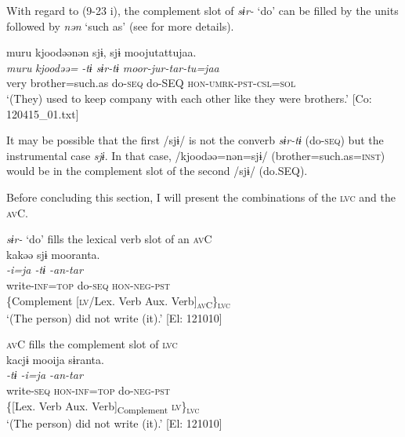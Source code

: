With regard to (9-23 i), the complement slot of \textit{sɨr-} ‘do’ can be filled by the units followed by \textit{nən} ‘such as’ (see  for more details).

\ea   \label{ex:9.33}
\glll  muru  kjoodəənən  sjɨ,  sjɨ  moojutattujaa.\\
    \textit{muru}  \textit{kjoodəə=}  \textit{-tɨ  sɨr-tɨ  moor-jur-tar-tu=jaa}\\
    very  brother=such.as  do-\textsc{seq}  do-SEQ  \textsc{hon}-\textsc{umrk}-\textsc{pst}-\textsc{csl}=\textsc{sol}\\
    \glt     ‘(They) used to keep company with each other like they were brothers.’ [Co: 120415\_01.txt]
\z

It may be possible that the first /sjɨ/ is not the converb \textit{sɨr-tɨ} (do-\textsc{seq}) but the instrumental case \textit{sjɨ}. In that case, /kjoodəə=nən=sjɨ/ (brother=such.as=\textsc{inst}) would be in the complement slot of the second /sjɨ/ (do.SEQ).

Before concluding this section, I will present the combinations of the \textsc{lvc} and the \textsc{av}C.

\ea   \label{ex:9.34}
\ea \textit{sɨr-} ‘do’ fills the lexical verb slot of an \textsc{av}C \label{ex:9.34a}\\
 \gllll  kakəə  sjɨ  mooranta.\\
    \textit{-i=ja  -tɨ  -an-tar}\\
    write-\textsc{inf}=\textsc{top}  do-\textsc{seq}  \textsc{hon}-\textsc{neg}-\textsc{pst}\\
    \{Complement  [\textsc{lv}/Lex. Verb  Aux. Verb]\textsubscript{\textsc{av}C}\}\textsubscript{\textsc{lvc}}\\
    \glt     ‘(The person) did not write (it).’ [El: 121010]

\ex \textsc{av}C fills the complement slot of \textsc{lvc}\label{ex:9.34b}\\
 \gllll  kacjɨ  mooija  sɨranta.\\
    \textit{-tɨ  -i=ja  -an-tar}\\
    write-\textsc{seq}  \textsc{hon}-\textsc{inf}=\textsc{top}  do-\textsc{neg}-\textsc{pst}\\
    \{[Lex. Verb  Aux. Verb]\textsubscript{Complement}  \textsc{lv}\}\textsubscript{\textsc{lvc}}\\
    \glt     ‘(The person) did not write (it).’ [El: 121010]
    \z
\z

